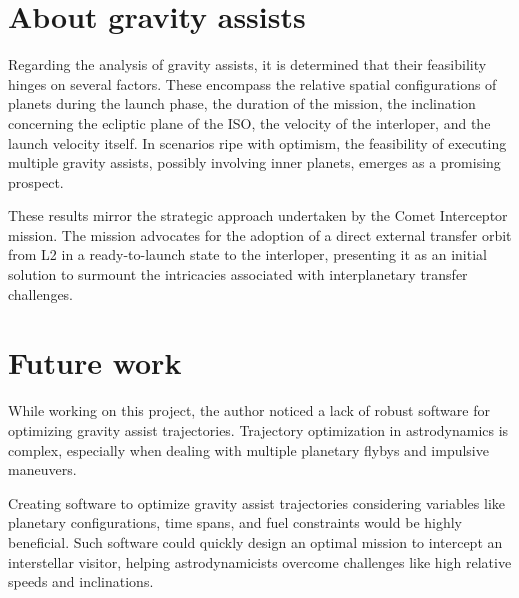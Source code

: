 \section{About gravity assists}

Regarding the analysis of gravity assists, it is determined that their
feasibility hinges on several factors. These encompass the relative spatial
configurations of planets during the launch phase, the duration of the mission,
the inclination concerning the ecliptic plane of the ISO, the velocity of the
interloper, and the launch velocity itself. In scenarios ripe with optimism, the
feasibility of executing multiple gravity assists, possibly involving inner
planets, emerges as a promising prospect.

These results mirror the strategic approach undertaken by the Comet Interceptor
mission. The mission advocates for the adoption of a direct external transfer
orbit from L2 in a ready-to-launch state to the interloper, presenting it as an
initial solution to surmount the intricacies associated with interplanetary
transfer challenges.

\section{Future work}

While working on this project, the author noticed a lack of robust software for
optimizing gravity assist trajectories. Trajectory optimization in astrodynamics
is complex, especially when dealing with multiple planetary flybys and impulsive
maneuvers.

Creating software to optimize gravity assist trajectories considering variables
like planetary configurations, time spans, and fuel constraints would be highly
beneficial. Such software could quickly design an optimal mission to intercept
an interstellar visitor, helping astrodynamicists overcome challenges like high
relative speeds and inclinations.
